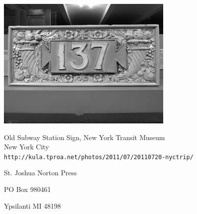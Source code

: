 \documentclass[12pt]{article}
\begin{document}
\begin{center}
\includegraphics{sign.png}

Old Subway Station Sign, New York Transit Museum \\
New York City \\
{\tt http://kula.tproa.net/photos/2011/07/20110720-nyctrip/ }
\end{center}



\newpage

\thispagestyle{empty}
\vspace*{12cm}
\begin{sideways}
\Large{St. Joshua Norton Press}
\end{sideways}
\begin{sideways}
\Large{PO Box 980461}
\end{sideways}
\begin{sideways}
\Large{Ypsilanti MI 48198}
\end{sideways}
\end{document}
